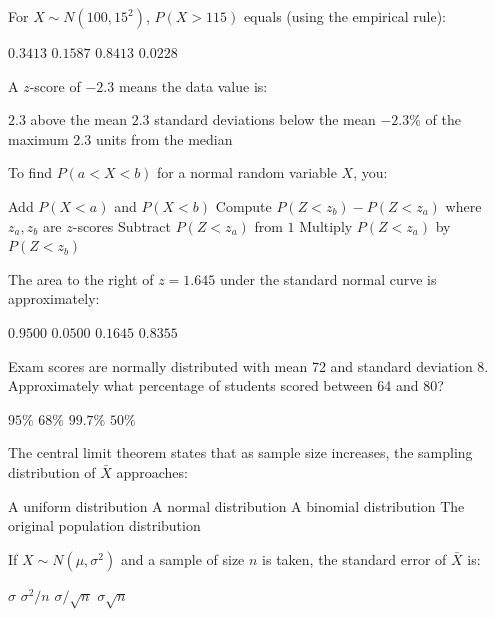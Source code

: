 \documentclass[addpoints]{exam}
\begin{document}
\begin{questions}
\question[1] For $X \sim N(100, 15^2)$, $P(X > 115)$ equals (using the empirical rule):
\begin{choices}
    \choice $0.3413$
    \correctchoice $0.1587$
    \choice $0.8413$
    \choice $0.0228$
\end{choices}

\question[1] A $z$-score of $-2.3$ means the data value is:
\begin{choices}
    \choice $2.3$ above the mean
    \correctchoice $2.3$ standard deviations below the mean
    \choice $-2.3\%$ of the maximum
    \choice $2.3$ units from the median
\end{choices}

\question[1] To find $P(a < X < b)$ for a normal random variable $X$, you:
\begin{choices}
    \choice Add $P(X < a)$ and $P(X < b)$
    \correctchoice Compute $P(Z < z_b) - P(Z < z_a)$ where $z_a, z_b$ are $z$-scores
    \choice Subtract $P(Z < z_a)$ from $1$
    \choice Multiply $P(Z < z_a)$ by $P(Z < z_b)$
\end{choices}

\question[1] The area to the right of $z = 1.645$ under the standard normal curve is
approximately:
\begin{choices}
    \choice $0.9500$
    \correctchoice $0.0500$
    \choice $0.1645$
    \choice $0.8355$
\end{choices}

\question[1] Exam scores are normally distributed with mean 72 and standard deviation 8.
Approximately what percentage of students scored between 64 and 80?
\begin{choices}
    \choice $95\%$
    \correctchoice $68\%$
    \choice $99.7\%$
    \choice $50\%$
\end{choices}

\question[1] The central limit theorem states that as sample size increases, the
sampling distribution of $\bar{X}$ approaches:
\begin{choices}
    \choice A uniform distribution
    \correctchoice A normal distribution
    \choice A binomial distribution
    \choice The original population distribution
\end{choices}

\question[1] If $X \sim N(\mu, \sigma^2)$ and a sample of size $n$ is taken, the standard
error of $\bar{X}$ is:
\begin{choices}
    \choice $\sigma$
    \choice $\sigma^2 / n$
    \correctchoice $\sigma / \sqrt{n}$
    \choice $\sigma \sqrt{n}$
\end{choices}


\end{questions}
\end{document}

